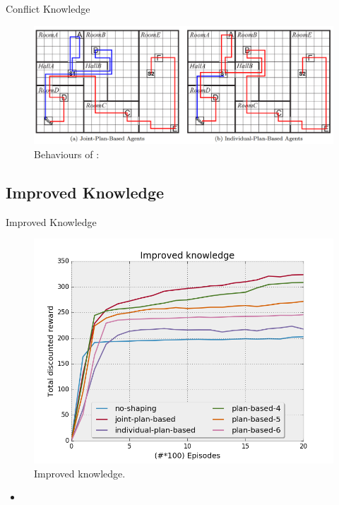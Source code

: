 \documentclass{bredelebeamer}
\begin{document}
\begin{frame}{Conflict Knowledge}

\begin{figure}[h!]
  \includegraphics[height=0.4\textheight]{../article/img/behavious.png}
  \caption{Behaviours of :}
  \label{fig:behave}
\end{figure}

\end{frame}

\subsection{Improved Knowledge}
\begin{frame}{Improved Knowledge}


\begin{figure}[h!]
  \includegraphics[height=0.4\textheight]{../article/img/knowledge.png}
  \caption{Improved knowledge.}
  \label{fig:results2}
\end{figure}

\begin{block}{}
\begin{itemize}
\item 
\end{itemize}
\end{block}

\end{frame}
\end{document}

